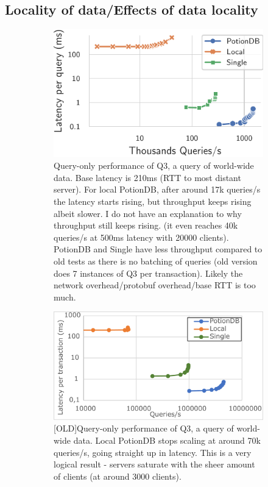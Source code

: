 \documentclass[sigplan,10pt]{acmart}
\begin{document}
\subsection{Locality of data/Effects of data locality}

\begin{figure}[h]
	\centering
	\begin{subfigure}{.47\linewidth}
		\includegraphics[width=1\linewidth]{singleQuery/q3_latency}
		\caption{Query-only performance of Q3, a query of world-wide data. Base latency is 210ms (RTT to most distant server). For local PotionDB, after around 17k queries/s the latency starts rising, but throughput keeps rising albeit slower. I do not have an explanation to why throughput still keeps rising. (it even reaches 40k queries/s at 500ms latency with 20000 clients). PotionDB and Single have less throughput compared to old tests as there is no batching of queries (old version does 7 instances of Q3 per transaction). Likely the network overhead/protobuf overhead/base RTT is too much.}
		\label{fig:(new)q3_tc}
	\end{subfigure}%
	\hspace*{3em}
	\begin{subfigure}{.47\linewidth}
		\includegraphics[width=1\linewidth]{Q3_tc}
		\caption{[OLD]Query-only performance of Q3, a query of world-wide data. Local PotionDB stops scaling at around 70k queries/s, going straight up in latency. This is a very logical result - servers saturate with the sheer amount of clients (at around 3000 clients).}
		\label{fig:(old)q3_tc}
	\end{subfigure}
	\caption{}
\end{figure}
\end{document}
